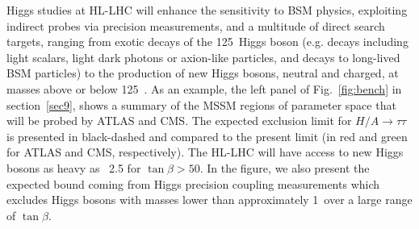 \documentclass[../report.tex]{subfiles}
\begin{document}



Higgs studies at HL-LHC will enhance the sensitivity to BSM physics, exploiting indirect probes via precision measurements, and a multitude of direct search targets, ranging from exotic decays of the 125~\UGeV Higgs boson (e.g. decays including light scalars, light dark photons or axion-like particles, and decays to long-lived BSM particles) to the production of new Higgs bosons, neutral and charged, at masses above or below 125~\UGeV.
As an example, the left panel of Fig.~\ref{fig:bench} in section~\ref{sec9}, shows a summary of the MSSM regions of parameter space that will be probed by ATLAS and CMS. The expected exclusion limit for $H/A\to \tau \tau$ is presented in black-dashed and compared to the present limit (in red and green for ATLAS and CMS, respectively). The HL-LHC will have access to new Higgs bosons as heavy as ~2.5 \UTeV for $\tan\beta>50$. In the figure, we also present the expected bound coming from  Higgs precision coupling measurements which excludes Higgs bosons with masses lower than approximately 1~\UTeV over a large range of $\tan\beta$.
\end{document}
